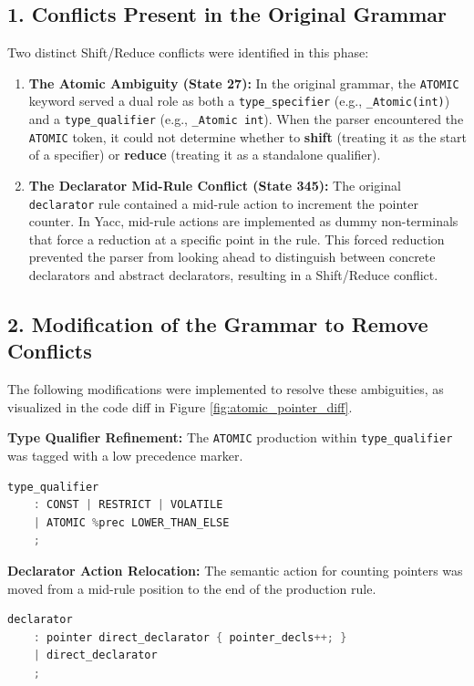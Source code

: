 \documentclass[a4paper,12pt]{article}
\begin{document}
\subsection{1. Conflicts Present in the Original Grammar}
Two distinct Shift/Reduce conflicts were identified in this phase:
\begin{enumerate}
    \item \textbf{The Atomic Ambiguity (State 27):} In the original grammar, the \texttt{ATOMIC} keyword served a dual role as both a \texttt{type\_specifier} (e.g., \texttt{\_Atomic(int)}) and a \texttt{type\_qualifier} (e.g., \texttt{\_Atomic int}). When the parser encountered the \texttt{ATOMIC} token, it could not determine whether to \textbf{shift} (treating it as the start of a specifier) or \textbf{reduce} (treating it as a standalone qualifier).
    
    \item \textbf{The Declarator Mid-Rule Conflict (State 345):} The original \texttt{declarator} rule contained a mid-rule action to increment the pointer counter. In Yacc, mid-rule actions are implemented as dummy non-terminals that force a reduction at a specific point in the rule. This forced reduction prevented the parser from looking ahead to distinguish between concrete declarators and abstract declarators, resulting in a Shift/Reduce conflict.
\end{enumerate}

\subsection{2. Modification of the Grammar to Remove Conflicts}
The following modifications were implemented to resolve these ambiguities, as visualized in the code diff in Figure \ref{fig:atomic_pointer_diff}.

\textbf{Type Qualifier Refinement:}
The \texttt{ATOMIC} production within \texttt{type\_qualifier} was tagged with a low precedence marker.
\begin{lstlisting}[language=C]
type_qualifier
    : CONST | RESTRICT | VOLATILE
    | ATOMIC %prec LOWER_THAN_ELSE
    ;
\end{lstlisting}

\textbf{Declarator Action Relocation:}
The semantic action for counting pointers was moved from a mid-rule position to the end of the production rule.
\begin{lstlisting}[language=C]
declarator
    : pointer direct_declarator { pointer_decls++; }
    | direct_declarator
    ;
\end{lstlisting}
\end{document}
